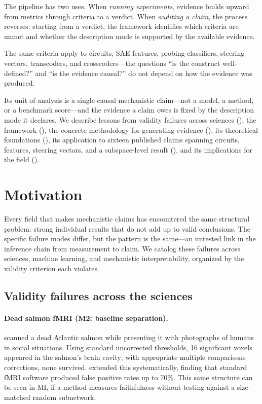 \documentclass{article}
\begin{document}
The pipeline has two uses. When \emph{running experiments}, evidence builds upward from metrics through criteria to a verdict. When \emph{auditing a claim}, the process reverses: starting from a verdict, the framework identifies which criteria are unmet and whether the description mode is supported by the available evidence.

The same criteria apply to circuits, SAE features, probing classifiers, steering vectors, transcoders, and crosscoders---the questions ``is the construct well-defined?'' and ``is the evidence causal?'' do not depend on how the evidence was produced.

Its unit of analysis is a single causal mechanistic claim---not a model, a method, or a benchmark score---and the evidence a claim owes is fixed by the description mode it declares. We describe lessons from validity failures across sciences (), the framework (), the concrete methodology for generating evidence (), its theoretical foundations (), its application to sixteen published claims spanning circuits, features, steering vectors, and a subspace-level result (), and its implications for the field ().


\section{Motivation}
\label{sec:motivation}

Every field that makes mechanistic claims has encountered the same structural problem: strong individual results that do not add up to valid conclusions. The specific failure modes differ, but the pattern is the same---an untested link in the inference chain from measurement to claim. We catalog these failures across sciences, machine learning, and mechanistic interpretability, organized by the validity criterion each violates.

\subsection{Validity failures across the sciences}

\paragraph{Dead salmon fMRI (M2: baseline separation).}
\citet{bennett2010neural} scanned a dead Atlantic salmon while presenting it with photographs of humans in social situations. Using standard uncorrected thresholds, 16 significant voxels appeared in the salmon's brain cavity; with appropriate multiple comparisons corrections, none survived. \citet{eklund2016cluster} extended this systematically, finding that standard fMRI software produced false positive rates up to 70\%. This same structure can be seen in MI, if a method measures faithfulness without testing against a size-matched random subnetwork.
\end{document}
